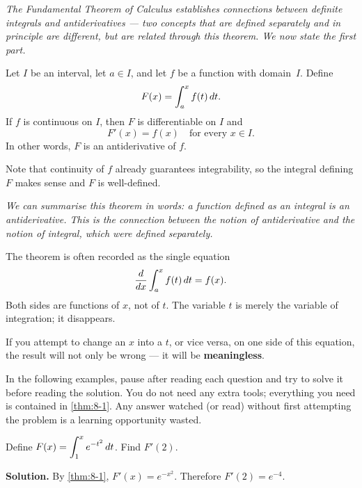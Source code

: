 \textit{The Fundamental Theorem of Calculus establishes connections between definite integrals and antiderivatives --- two concepts that are defined separately and in principle are different, but are related through this theorem.  We now state the first part.}

\begin{theorem}
\label{thm:8-1}
Let $I$ be an interval, let $a \in I$, and let $f$ be a function with domain~$I$.  Define
\[
  F(x) = \int_{a}^{x} f(t)\,dt.
\]
If $f$ is continuous on $I$, then $F$ is differentiable on $I$ and
\[
  F'(x) = f(x) \quad \text{for every } x \in I.
\]
In other words, $F$ is an antiderivative of $f$.
\end{theorem}

\begin{remark}
Note that continuity of $f$ already guarantees integrability, so the integral defining $F$ makes sense and $F$ is well-defined.
\end{remark}

\textit{We can summarise this theorem in words: a function defined as an integral is an antiderivative.  This is the connection between the notion of antiderivative and the notion of integral, which were defined separately.}

The theorem is often recorded as the single equation
\[
  \frac{d}{dx}\int_{a}^{x} f(t)\,dt = f(x).
\]
Both sides are functions of $x$, not of $t$.  The variable $t$ is merely the variable of integration; it disappears.

\begin{remark}[Warning]
If you attempt to change an $x$ into a $t$, or vice versa, on one side of this equation, the result will not only be wrong --- it will be \textbf{meaningless}.
\end{remark}

\begin{remark}
In the following examples, pause after reading each question and try to solve it before reading the solution.  You do not need any extra tools; everything you need is contained in \cref{thm:8-1}.  Any answer watched (or read) without first attempting the problem is a learning opportunity wasted.
\end{remark}

\begin{example}
\label{ex:8-4}
Define $F(x) = \displaystyle\int_{1}^{x} e^{-t^{2}}\,dt$.  Find $F'(2)$.

\textbf{Solution.}  By \cref{thm:8-1}, $F'(x) = e^{-x^{2}}$.  Therefore $F'(2) = e^{-4}$.
\end{example}

